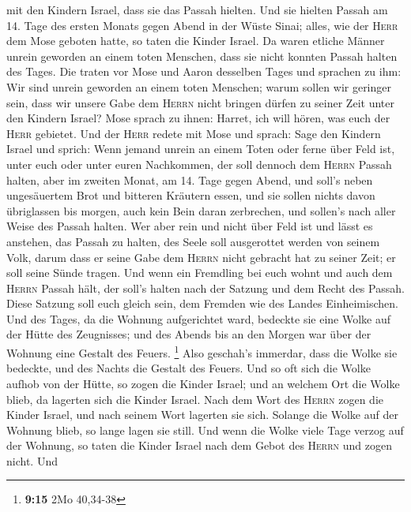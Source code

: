mit den Kindern Israel, dass sie das Passah hielten.  Und
sie hielten Passah am 14. Tage des ersten Monats gegen Abend in der
Wüste Sinai; alles, wie der \textsc{Herr} dem Mose geboten hatte, so
taten die Kinder Israel.  Da waren etliche Männer unrein
geworden an einem toten Menschen, dass sie nicht konnten Passah halten
des Tages. Die traten vor Mose und Aaron desselben Tages 
und sprachen zu ihm: Wir sind unrein geworden an einem toten Menschen;
warum sollen wir geringer sein, dass wir unsere Gabe dem \textsc{Herrn}
nicht bringen dürfen zu seiner Zeit unter den Kindern Israel?
 Mose sprach zu ihnen: Harret, ich will hören, was euch
der \textsc{Herr} gebietet.  Und der \textsc{Herr} redete
mit Mose und sprach:  Sage den Kindern Israel und sprich:
Wenn jemand unrein an einem Toten oder ferne über Feld ist, unter euch
oder unter euren Nachkommen, der soll dennoch dem \textsc{Herrn} Passah
halten,  aber im zweiten Monat, am 14. Tage gegen Abend,
und soll's neben ungesäuertem Brot und bitteren Kräutern essen,
 und sie sollen nichts davon übriglassen bis morgen, auch
kein Bein daran zerbrechen, und sollen's nach aller Weise des Passah
halten.  Wer aber rein und nicht über Feld ist und lässt
es anstehen, das Passah zu halten, des Seele soll ausgerottet werden von
seinem Volk, darum dass er seine Gabe dem \textsc{Herrn} nicht gebracht
hat zu seiner Zeit; er soll seine Sünde tragen.  Und wenn
ein Fremdling bei euch wohnt und auch dem \textsc{Herrn} Passah hält,
der soll's halten nach der Satzung und dem Recht des Passah. Diese
Satzung soll euch gleich sein, dem Fremden wie des Landes Einheimischen.
 Und des Tages, da die Wohnung aufgerichtet ward,
bedeckte sie eine Wolke auf der Hütte des Zeugnisses; und des Abends bis
an den Morgen war über der Wohnung eine Gestalt des Feuers. \footnote{\textbf{9:15}
  2Mo 40,34-38}  Also geschah's immerdar, dass die Wolke
sie bedeckte, und des Nachts die Gestalt des Feuers.  Und
so oft sich die Wolke aufhob von der Hütte, so zogen die Kinder Israel;
und an welchem Ort die Wolke blieb, da lagerten sich die Kinder Israel.
 Nach dem Wort des \textsc{Herrn} zogen die Kinder
Israel, und nach seinem Wort lagerten sie sich. Solange die Wolke auf
der Wohnung blieb, so lange lagen sie still.  Und wenn
die Wolke viele Tage verzog auf der Wohnung, so taten die Kinder Israel
nach dem Gebot des \textsc{Herrn} und zogen nicht.  Und

